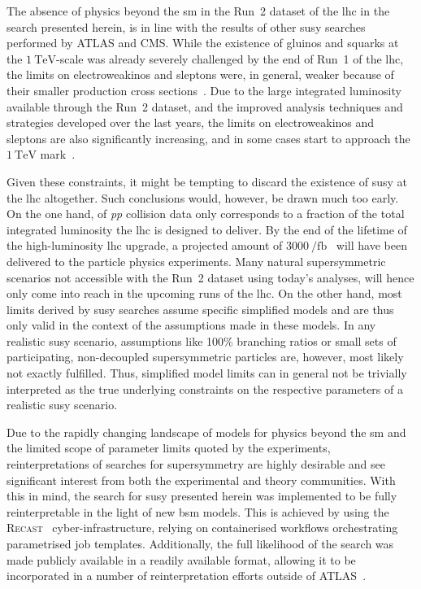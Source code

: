 The absence of physics beyond the \gls{sm} in the Run~2 dataset of the \gls{lhc} in the search presented herein, is in line with the results of other \gls{susy} searches performed by ATLAS and CMS.
While the existence of gluinos and squarks at the $\SI{1}{\TeV}$-scale was already severely challenged by the end of Run~1 of the \gls{lhc}, the limits on electroweakinos and sleptons were, in general, weaker because of their smaller production cross sections~\cite{SUSY-2014-06,SUSY-2014-05}.
Due to the large integrated luminosity available through the Run~2 dataset, and the improved analysis techniques and strategies developed over the last years, the limits on electroweakinos and sleptons are also significantly increasing, and in some cases start to approach the $\SI{1}{\TeV}$ mark~\cite{ATL-PHYS-PUB-2021-007,SUSY-2018-32}. 

Given these constraints, it might be tempting to discard the existence of \gls{susy} at the \gls{lhc} altogether. Such conclusions would, however, be drawn much too early.
On the one hand, \onethirtynineifb of \textit{pp} collision data only corresponds to a fraction of the total integrated luminosity the \gls{lhc} is designed to deliver. By the end of the lifetime of the high-luminosity \gls{lhc} upgrade, a projected amount of $\SI{3000}{\per\femto\barn}$~\cite{Apollinari:2116337} will have been delivered to the particle physics experiments.
Many natural supersymmetric scenarios not accessible with the Run~2 dataset using today's analyses, will hence only come into reach in the upcoming runs of the \gls{lhc}.
On the other hand, most limits derived by \gls{susy} searches assume specific simplified models and are thus only valid in the context of the assumptions made in these models.
In any realistic \gls{susy} scenario, assumptions like 100\% branching ratios or small sets of participating, non-decoupled supersymmetric particles are, however, most likely not exactly fulfilled.
Thus, simplified model limits can in general not be trivially interpreted as the true underlying constraints on the respective parameters of a realistic \gls{susy} scenario.
 
Due to the rapidly changing landscape of models for physics beyond the \gls{sm} and the limited scope of parameter limits quoted by the experiments, reinterpretations of searches for supersymmetry are highly desirable and see significant interest from both the experimental and theory communities.
With this in mind, the search for \gls{susy} presented herein was implemented to be fully reinterpretable in the light of new \gls{bsm} models.
This is achieved by using the \textsc{Recast}~\cite{RECAST_cranmer} cyber-infrastructure, relying on containerised workflows orchestrating parametrised job templates.
Additionally, the full likelihood of the search was made publicly available in a readily available format, allowing it to be incorporated in a number of reinterpretation efforts outside of ATLAS~\cite{SModelS_pyhf:2020grj,Goodsell:2020ddr}. 
 
